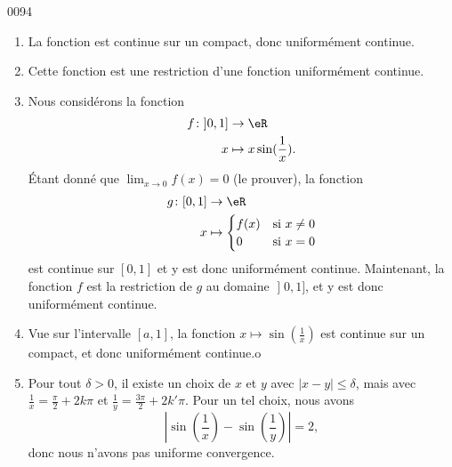 
\begin{corrige}{0094}

\begin{enumerate}

\item
La fonction est continue sur un compact, donc uniformément continue.

\item
Cette fonction est une restriction d'une fonction uniformément continue.

\item
Nous considérons la fonction
\begin{equation}
	\begin{aligned}
		f\colon \mathopen]0,1\mathclose]&\to  \eR \\
		x&\mapsto x\sin(\frac{1}{ x }). 
	\end{aligned}
\end{equation}
Étant donné que $\lim_{x\to 0}f(x)=0$ (le prouver), la fonction
\begin{equation}
	\begin{aligned}
		g\colon \mathopen[0,1\mathclose]&\to  \eR \\
		x&\mapsto 
		\begin{cases}
			f(x) 	&	\text{si }x\neq 0\\
			0	&	 \text{si }x=0
\end{cases}
	\end{aligned}
\end{equation}
est continue sur $[0,1]$ et y est donc uniformément continue. Maintenant, la fonction $f$ est la restriction de $g$ au domaine $\mathopen]0,1\mathclose]$, et y est donc uniformément continue.


\item
Vue sur l'intervalle $[a,1]$, la fonction $x\mapsto\sin(\frac{1}{ x })$ est continue sur un compact, et donc uniformément continue.o

\item
Pour tout $\delta>0$, il existe un choix de $x$ et $y$ avec $| x-y |\leq\delta$, mais avec $\frac{1}{ x }=\frac{ \pi }{ 2 }+2k\pi$ et $\frac{1}{ y }=\frac{ 3\pi }{2}+2k'\pi$. Pour un tel choix, nous avons
\begin{equation}
	\left| \sin(\frac{1}{ x })-\sin(\frac{1}{ y }) \right| =2,
\end{equation}
donc nous n'avons pas uniforme convergence.


\end{enumerate}
\end{corrige}
